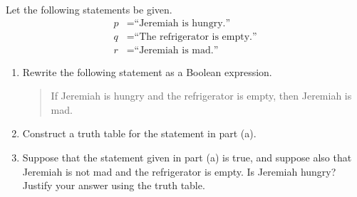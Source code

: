 \documentclass{article}
\theoremstyle{definition}
\begin{document}
\begin{question}
	Let the following statements be given.
		\begin{align*}
		p &= \text{``Jeremiah is hungry.''}\\
		q &= \text{``The refrigerator is empty.''}\\
		r &= \text{``Jeremiah is mad.''}
		\end{align*}
	\begin{enumerate}
		\item Rewrite the following statement as a Boolean expression.\\
			\begin{quote}
			If Jeremiah is hungry and the refrigerator is empty, then Jeremiah is mad.
			\end{quote}
		\item Construct a truth table for the statement in part (a).
		\item Suppose that the statement given in part (a) is true, and suppose also that Jeremiah is not mad and the refrigerator is empty. Is Jeremiah hungry? Justify your answer using the truth table.
	\end{enumerate}
\end{question}
\begin{solution}
\end{solution}
\end{document}
